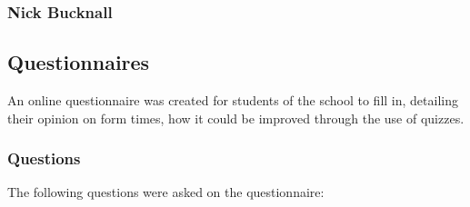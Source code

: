 \subsubsection{Nick Bucknall}

\subsection{Questionnaires}
An online questionnaire was created for students of the school to fill in, detailing their opinion on form times, how it could be improved through the use of quizzes.

\subsubsection{Questions}
The following questions were asked on the questionnaire:

